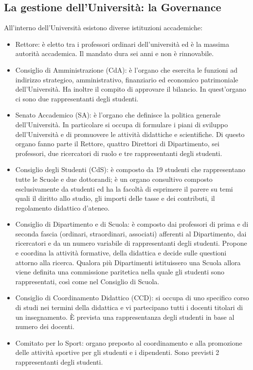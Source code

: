 \subsection{La gestione dell’Università: la Governance}
All’interno dell’Università esistono diverse istituzioni accademiche:
\begin{itemize}
\item Rettore: è eletto tra i professori ordinari dell’università ed è la massima autorità accademica. Il mandato dura sei anni e non è rinnovabile.
\item Consiglio di Amministrazione (CdA): è l'organo che esercita le funzioni ad indirizzo strategico,  amministrativo, finanziario ed economico patrimoniale dell'Università. Ha inoltre il compito di approvare il bilancio. In quest'organo ci sono due rappresentanti degli studenti.
\item Senato Accademico (SA): è l'organo che definisce la politica generale dell'Università. In particolare si occupa di formulare i piani di sviluppo dell'Università e di promuovere le attività didattiche e scientifiche. Di questo organo fanno parte il Rettore, quattro Direttori di Dipartimento, sei professori, due ricercatori di ruolo e tre rappresentanti degli studenti.
\item Consiglio degli Studenti (CdS): è composto da 19 studenti che rappresentano tutte le Scuole e due dottorandi; è un organo consultivo composto esclusivamente da studenti ed ha la facoltà di esprimere il parere su temi quali il diritto allo studio, gli importi delle tasse e dei contributi, il regolamento didattico d’ateneo.
\item Consiglio di Dipartimento e di Scuola: è composto dai professori di prima e di seconda fascia (ordinari, straordinari, associati) afferenti al Dipartimento, dai ricercatori e da un numero variabile di rappresentanti degli studenti. Propone e coordina la attività formative, della didattica e decide sulle questioni attorno alla ricerca. Qualora più Dipartimenti istituissero una Scuola allora viene definita una commissione paritetica nella quale gli studenti sono rappresentati, così come nel Consiglio di Scuola.
\item Consiglio di Coordinamento Didattico (CCD): si occupa di uno specifico corso di studi nei termini della didattica e vi partecipano tutti i docenti titolari di un insegnamento. È prevista una rappresentanza degli studenti in base al numero dei docenti.
\item Comitato per lo Sport: organo preposto al coordinamento e alla promozione delle attività sportive per gli studenti e i dipendenti. Sono previsti 2 rappresentanti degli studenti.
\end{itemize}
